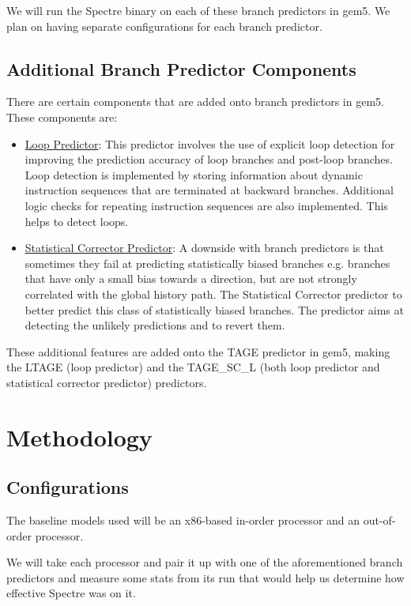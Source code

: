 \documentclass[twocolumn,showpacs,%
  nofootinbib,aps,superscriptaddress,%
  eqsecnum,prd,notitlepage,showkeys,10pt]{revtex4-1}
\begin{document}
We will run the Spectre binary on each of these branch predictors in gem5. We plan on having separate configurations for each branch predictor.

\subsection{Additional Branch Predictor Components}
There are certain components that are added onto branch predictors in gem5. These components are:

\begin{itemize}
    \item \underline{Loop Predictor}: This predictor involves the use of explicit loop detection for improving the prediction accuracy of loop branches and post-loop branches. Loop detection is implemented by storing information about dynamic instruction sequences that are terminated at backward branches. Additional logic checks for repeating instruction sequences are also implemented. This helps to detect loops.\cite{joseph2000improving}
    \item \underline{Statistical Corrector Predictor}: A downside with branch predictors is that sometimes they fail at predicting statistically biased branches e.g. branches that have only a small bias towards a direction, but are not strongly correlated with the global history path. The Statistical Corrector predictor to better predict this class of statistically biased branches. The predictor aims at detecting the unlikely predictions and to revert them.\cite{seznec2016tage}
\end{itemize}

These additional features are added onto the TAGE predictor in gem5, making the LTAGE (loop predictor) and the TAGE\_SC\_L (both loop predictor and statistical corrector predictor) predictors.

\section{Methodology}

\subsection{Configurations}

The baseline models used will be an x86-based in-order processor and an out-of-order processor.

We will take each processor and pair it up with one of the aforementioned branch predictors and measure some stats from its run that would help us determine how effective Spectre was on it.
\end{document}
